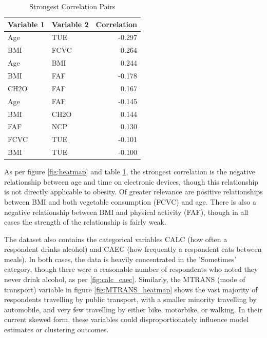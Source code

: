 \begin{table}
\centering
\caption{Strongest Correlation Pairs}
\label{tab:top_correlations}
\begin{tabular}{llr}
\toprule
Variable 1 & Variable 2 &  Correlation \\
\midrule
Age        & TUE        &    -0.297 \\
BMI        & FCVC       &     0.264 \\
Age        & BMI        &     0.244 \\
BMI        & FAF        &    -0.178 \\
CH2O       & FAF        &     0.167 \\
Age        & FAF        &    -0.145 \\
BMI        & CH2O       &     0.144 \\
FAF        & NCP        &     0.130 \\
FCVC       & TUE        &    -0.101 \\
BMI        & TUE        &    -0.100 \\
\bottomrule
\end{tabular}
\end{table}

As per figure \ref{fig:heatmap} and table \ref{tab:top_correlations}, the strongest correlation is the negative relationship between age and time on electronic devices, though this relationship is not directly applicable to obesity. Of greater relevance are positive relationships between BMI and both vegetable consumption (FCVC) and age. There is also a negative relationship between BMI and physical activity (FAF), though in all cases the strength of the relationship is fairly weak. 

\FloatBarrier

The dataset also contains the categorical variables CALC (how often a respondent drinks alcohol) and CAEC (how frequently a respondent eats between meals). In both cases, the data is heavily concentrated in the 'Sometimes' category, though there were a reasonable number of respondents who noted they never drink alcohol, as per \ref{fig:calc_caec}. Similarly, the MTRANS (mode of transport) variable in figure \ref{fig:MTRANS_heatmap} shows the vast majority of respondents travelling by public transport, with a smaller minority travelling by automobile, and very few travelling by either bike, motorbike, or walking. In their current skewed form, these variables could disproportionately influence model estimates or clustering outcomes.

